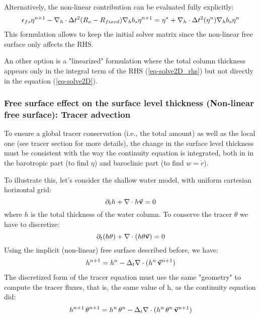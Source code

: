 Alternatively, the non-linear contribution can be evaluated fully
explicitly:
\begin{eqnarray*}
\epsilon_{fs} {\eta}^{n+1} -
{\bf \nabla}_h \cdot \Delta t^2 (R_o-R_{fixed})
{\bf \nabla}_h b_s {\eta}^{n+1}
= {\eta}^*
+{\bf \nabla}_h \cdot \Delta t^2 (\eta^{n})
{\bf \nabla}_h b_s {\eta}^{n}
\end{eqnarray*} 
This formulation allows to keep the initial solver matrix
since the non-linear free surface only affects the RHS.

An other option is a "linearized" formulation where the 
total column thickness appears only in the integral term of 
the RHS (\ref{eq-solve2D_rhs}) but not directly in 
the equation (\ref{eq-solve2D}).

\subsubsection{Free surface effect on the surface level thickness
(Non-linear free surface): Tracer advection}

To ensure a global tracer conservation (i.e., the total amount)
as well as the local one (see tracer section for more details), 
the change in the surface level thickness must be consistent with
the way the continuity equation is integrated, both in 
in the barotropic part (to find $\eta$) and baroclinic part
(to find $w = \dot{r}$).

To illustrate this, let's consider the shallow water model,
with uniform cartesian horizontal grid:
$$
\partial_t h + \nabla \cdot h \vec{\bf v} = 0
$$
where $h$ is the total thickness of the water column.
To conserve the tracer $\theta$ we have to discretize:
$$
\partial_t (h \theta) + \nabla \cdot ( h \theta \vec{\bf v})= 0
$$
Using the implicit (non-linear) free surface described before, we have:
\begin{eqnarray*}
h^{n+1} = h^{n} - \Delta_t \nabla \cdot (h^n \, \vec{\bf v}^{n+1} ) \\
\end{eqnarray*}
The discretized form of the tracer equation must use the same
"geometry" to compute the tracer fluxes, that is, the same value of
h, as the continuity equation did:
\begin{eqnarray*}
h^{n+1} \, \theta^{n+1} = h^n \, \theta^n 
        - \Delta_t \nabla \cdot (h^n \, \theta^n \, \vec{\bf v}^{n+1})
\end{eqnarray*}

